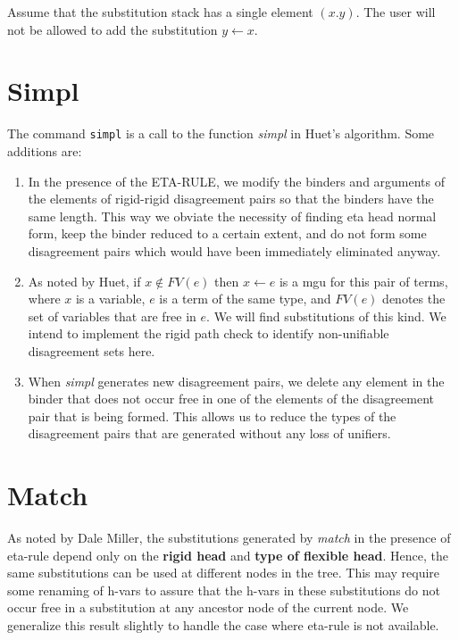 \begin{tpsexample}
Assume that the substitution stack has a single element $(x . y)$. The
user will not be allowed to add the substitution \(y \leftarrow x\).
\end{tpsexample}

\section{Simpl}
The command {\tt simpl} is a call to the function {\it simpl} in Huet's algorithm.
Some additions are:

\begin{enumerate}
\item In the presence of the ETA-RULE, we modify the binders and arguments of the
elements of rigid-rigid disagreement pairs so that the binders have the same
length. This way we obviate the necessity of finding eta head normal form,
keep the binder reduced to a certain extent, and do not form some disagreement
pairs which would have been immediately eliminated anyway.

\item As noted by Huet, if \(x \notin FV(e)\) then \(x \leftarrow e\) is a mgu
for this pair of terms, where \(x\) is a variable, \(e\) is a term
of the same type, and \(FV(e)\) denotes the set of variables that are free
in \(e\). We will find substitutions of this kind. We intend to
implement the rigid path check to identify non-unifiable disagreement sets here.

\item When {\it simpl} generates new disagreement pairs, we delete any element in the
binder that does not occur free in one of the elements of the disagreement
pair that is being formed. This allows us to reduce the types of the
disagreement pairs that are generated without any loss of unifiers.
\end{enumerate}


\section{Match}
As noted by Dale Miller, the substitutions generated by {\it match} in the presence
of eta-rule depend only on the {\bf rigid head} and {\bf type of flexible head}.
Hence, the same substitutions can be used at different nodes in the tree.
This may require some renaming of h-vars to assure that the h-vars in these
substitutions do not occur free in a substitution at any ancestor node of the
current node. We generalize this result slightly to handle the case where
eta-rule is not available.

